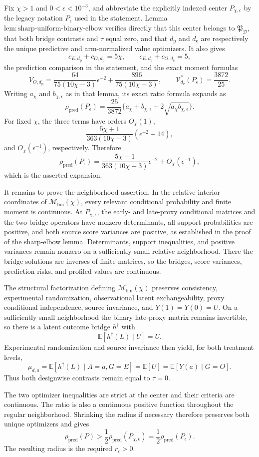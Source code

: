 Fix \(\chi>1\) and \(0<\epsilon<10^{-3}\), and abbreviate the explicitly indexed center \(P_{\chi,\epsilon}\) by the legacy notation \(P_\epsilon\) used in the statement. Lemma~\(\mathrm{lem{:}sharp\text{-}uniform\text{-}binary\text{-}elbow}\) verifies directly that this center belongs to \(\mathfrak P_{\mathcal D}\), that both bridge contrasts and \(\tau\) equal zero, and that \(d_{\mathrm p}\) and \(d_{\mathrm e}\) are respectively the unique predictive and arm-normalized value optimizers. It also gives
\[
 c_{E,d_{\mathrm p}}+c_{O,d_{\mathrm p}}=5\chi,
 \qquad
 c_{E,d_{\mathrm e}}+c_{O,d_{\mathrm e}}=5,
\]
the prediction comparison in the statement, and the exact moment formulas
\[
 V_{O,d_{\mathrm p}}
 =\frac{64}{75(10\chi-3)}\epsilon^{-2}
 +\frac{896}{75(10\chi-3)},
 \qquad
 \mathcal V_{d_{\mathrm e}}^*(P_\epsilon)=\frac{3872}{25}.
\]
Writing \(a_\chi\) and \(b_{\chi,\epsilon}\) as in that lemma, its exact ratio formula expands as
\[
 \rho_{\mathrm{pred}}(P_\epsilon)
 =\frac{25}{3872}
 \{a_\chi+b_{\chi,\epsilon}+2\sqrt{a_\chi b_{\chi,\epsilon}}\}.
\]
For fixed \(\chi\), the three terms have orders \(O_\chi(1)\),
\[
 \frac{5\chi+1}{363(10\chi-3)}(\epsilon^{-2}+14),
\]
and \(O_\chi(\epsilon^{-1})\), respectively. Therefore
\[
 \rho_{\mathrm{pred}}(P_\epsilon)
 =\frac{5\chi+1}{363(10\chi-3)}\epsilon^{-2}
 +O_\chi(\epsilon^{-1}),
\]
which is the asserted expansion.

It remains to prove the neighborhood assertion. In the relative-interior coordinates of \(\mathcal M_{\mathrm{bin}}(\chi)\), every relevant conditional probability and finite moment is continuous. At \(P_{\chi,\epsilon}\), the early- and late-proxy conditional matrices and the two bridge operators have nonzero determinants, all support probabilities are positive, and both source score variances are positive, as established in the proof of the sharp-elbow lemma. Determinants, support inequalities, and positive variances remain nonzero on a sufficiently small relative neighborhood. There the bridge solutions are inverses of finite matrices, so the bridges, score variances, prediction risks, and profiled values are continuous.

The structural factorization defining \(\mathcal M_{\mathrm{bin}}(\chi)\) preserves consistency, experimental randomization, observational latent exchangeability, proxy conditional independence, source invariance, and \(Y(1)=Y(0)=U\). On a sufficiently small neighborhood the binary late-proxy matrix remains invertible, so there is a latent outcome bridge \(h^\dagger\) with
\[
 \mathbb E[h^\dagger(L)\mid U]=U.
\]
Experimental randomization and source invariance then yield, for both treatment levels,
\[
 \mu_{d,a}
 =\mathbb E[h^\dagger(L)\mid A=a,G=E]
 =\mathbb E[U]
 =\mathbb E[Y(a)\mid G=O].                            \tag{1}
\]
Thus both designwise contrasts remain equal to \(\tau=0\).

The two optimizer inequalities are strict at the center and their criteria are continuous. The ratio is also a continuous positive function throughout the regular neighborhood. Shrinking the radius if necessary therefore preserves both unique optimizers and gives
\[
 \rho_{\mathrm{pred}}(P)
 >\frac12\rho_{\mathrm{pred}}(P_{\chi,\epsilon})
 =\frac12\rho_{\mathrm{pred}}(P_\epsilon).
\]
The resulting radius is the required \(r_\epsilon>0\).